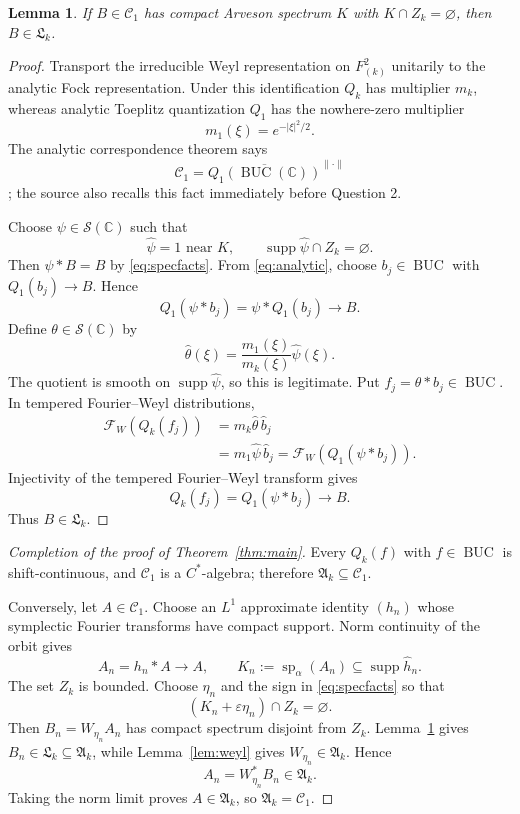 \documentclass[10pt]{article}
\newtheorem{lemma}{Lemma}
\newcommand{\C}{\mathbb C}
\newcommand{\BUC}{\operatorname{BUC}}
\newcommand{\cC}{\mathcal C}
\newcommand{\cF}{\mathcal F}
\newcommand{\cA}{\mathfrak A}
\newcommand{\cT}{\mathfrak L}
\begin{document}
\begin{lemma}\label{lem:local}
If \(B\in\cC_1\) has compact Arveson spectrum \(K\) with \(K\cap Z_k=\varnothing\), then \(B\in\cT_k\).
\end{lemma}

\begin{proof}
Transport the irreducible Weyl representation on \(F^2_{(k)}\) unitarily to the analytic Fock representation. Under this identification \(Q_k\) has multiplier \(m_k\), whereas analytic Toeplitz quantization \(Q_1\) has the nowhere-zero multiplier
\[
 m_1(\xi)=e^{-|\xi|^2/2}.
\]
The analytic correspondence theorem says
\begin{equation}\label{eq:analytic}
 \cC_1=\overline{Q_1(\BUC(\C))}^{\|\cdot\|}
\end{equation}
\cite[Theorem 3.1]{F}; the source also recalls this fact immediately before Question 2.

Choose \(\psi\in\mathcal S(\C)\) such that
\[
 \widehat\psi=1\text{ near }K,\qquad
 \operatorname{supp}\widehat\psi\cap Z_k=\varnothing.
\]
Then \(\psi*B=B\) by \eqref{eq:specfacts}. From \eqref{eq:analytic}, choose \(b_j\in\BUC\) with \(Q_1(b_j)\to B\). Hence
\[
 Q_1(\psi*b_j)=\psi*Q_1(b_j)\longrightarrow B.
\]
Define \(\theta\in\mathcal S(\C)\) by
\[
 \widehat\theta(\xi)
 =\frac{m_1(\xi)}{m_k(\xi)}\widehat\psi(\xi).
\]
The quotient is smooth on \(\operatorname{supp}\widehat\psi\), so this is legitimate. Put \(f_j=\theta*b_j\in\BUC\). In tempered Fourier--Weyl distributions,
\[
\begin{aligned}
 \cF_W(Q_k(f_j))
 &=m_k\widehat\theta\,\widehat b_j\\
 &=m_1\widehat\psi\,\widehat b_j
 =\cF_W(Q_1(\psi*b_j)).
\end{aligned}
\]
Injectivity of the tempered Fourier--Weyl transform gives
\[
 Q_k(f_j)=Q_1(\psi*b_j)\longrightarrow B.
\]
Thus \(B\in\cT_k\).
\end{proof}

\begin{proof}[Completion of the proof of Theorem~\ref{thm:main}]
Every \(Q_k(f)\) with \(f\in\BUC\) is shift-continuous, and \(\cC_1\) is a \(C^*\)-algebra; therefore \(\cA_k\subseteq\cC_1\).

Conversely, let \(A\in\cC_1\). Choose an \(L^1\) approximate identity \((h_n)\) whose symplectic Fourier transforms have compact support. Norm continuity of the orbit gives
\[
 A_n=h_n*A\longrightarrow A,
 \qquad
 K_n:=\operatorname{sp}_\alpha(A_n)
 \subseteq\operatorname{supp}\widehat h_n.
\]
The set \(Z_k\) is bounded. Choose \(\eta_n\) and the sign in \eqref{eq:specfacts} so that
\[
 (K_n+\varepsilon\eta_n)\cap Z_k=\varnothing.
\]
Then \(B_n=W_{\eta_n}A_n\) has compact spectrum disjoint from \(Z_k\). Lemma~\ref{lem:local} gives \(B_n\in\cT_k\subseteq\cA_k\), while Lemma~\ref{lem:weyl} gives \(W_{\eta_n}\in\cA_k\). Hence
\[
 A_n=W_{\eta_n}^*B_n\in\cA_k.
\]
Taking the norm limit proves \(A\in\cA_k\), so \(\cA_k=\cC_1\).
\end{proof}
\end{document}
